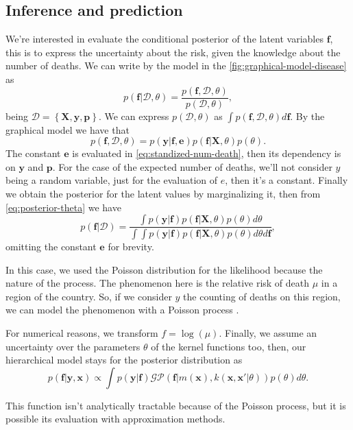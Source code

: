 \subsection{Inference and prediction}

We're interested in evaluate the conditional posterior of the latent variables $\mathbf{f}$, this is to express the uncertainty about the risk, given the knowledge about the number of deaths. We can write by the model in the \autoref{fig:graphical-model-disease} as
%
\begin{equation}
    p(\mathbf{f}|\mathcal{D},\theta) = \frac{p(\mathbf{f},\mathcal{D},\theta)}{p(\mathcal{D},\theta)},
    \label{eq:posterior-theta}
\end{equation}
%
being $\mathcal{D}=\left\{ \mathbf{X},\mathbf{y}, \mathbf{p} \right\}$. We can express $p(\mathcal{D},\theta)$ as $\int p(\mathbf{f},\mathcal{D},\theta)d\mathbf{f}$. By the graphical model we have that
%
\begin{equation}
    p(\mathbf{f},\mathcal{D},\theta) = p(\mathbf{y}|\mathbf{f},\mathbf{e})p(\mathbf{f}|\mathbf{X},\theta)p(\theta).
\end{equation}
%
The constant $\mathbf{e}$ is evaluated in \ref{eq:standized-num-death}, then its dependency is on $\mathbf{y}$ and $\mathbf{p}$. For the case of the expected number of deaths, we'll not consider $y$ being a random variable, just for the evaluation of $e$, then it's a constant. Finally we obtain the posterior for the latent values by marginalizing it, then from \ref{eq:posterior-theta} we have
{\color{red}
%
\begin{equation}
    p(\mathbf{f}|\mathcal{D})=\frac{\int p(\mathbf{y}|\mathbf{f})p(\mathbf{f}|\mathbf{X},\theta)p(\theta) d\theta}{\int \int p(\mathbf{y}|\mathbf{f})p(\mathbf{f}|\mathbf{X},\theta)p(\theta) d\theta d\mathbf{f}},
\end{equation}
%
}
omitting the constant $\mathbf{e}$ for brevity.
{\color{red}
%

In this case, we used the Poisson distribution for the likelihood because the nature of the process. The phenomenon here is the relative risk of death $\mu$ in a region of the country. So, if we consider $y$ the counting of deaths on this region, we can model the phenomenon with a Poisson process \cite{Vanhatalo2010Vehtari}.

For numerical reasons, we transform $f=\log(\mu)$. Finally, we assume an uncertainty over the parameters $\theta$ of the kernel functions too, then, our hierarchical model stays for the posterior distribution as 
%
\begin{equation}
    p(\mathbf{f}|\mathbf{y},\mathbf{x}) \propto \int p(\mathbf{y}|\mathbf{f})\mathcal{GP}\left(\mathbf{f} | m(\mathbf{x}),k(\mathbf{x},\mathbf{x}'|\theta) \right)p(\theta) d\theta.
\end{equation}

This function isn't analytically tractable because of the Poisson process, but it is possible its evaluation with approximation methods.

}
